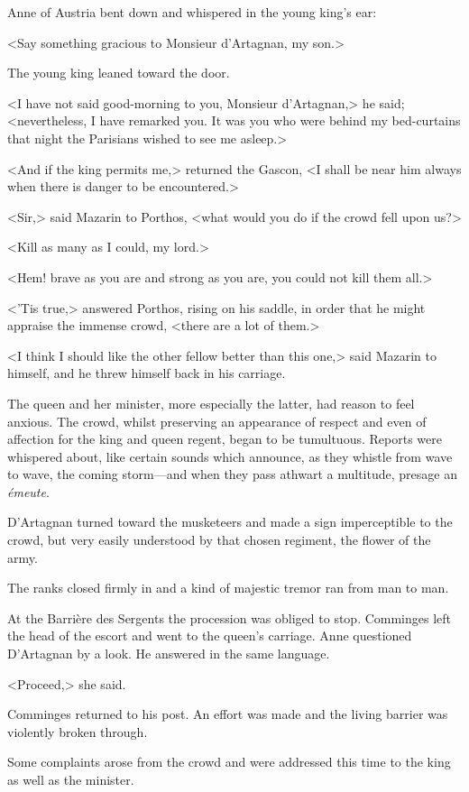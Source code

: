 Anne of Austria bent down and whispered in the young king's ear:

<Say something gracious to Monsieur d'Artagnan, my son.>

The young king leaned toward the door.

<I have not said good-morning to you, Monsieur d'Artagnan,> he said; <nevertheless, I have remarked you. It was you who were behind my bed-curtains that night the Parisians wished to see me asleep.>

<And if the king permits me,> returned the Gascon, <I shall be near him always when there is danger to be encountered.>

<Sir,> said Mazarin to Porthos, <what would you do if the crowd fell upon us?>

<Kill as many as I could, my lord.>

<Hem! brave as you are and strong as you are, you could not kill them all.>

<'Tis true,> answered Porthos, rising on his saddle, in order that he might appraise the immense crowd, <there are a lot of them.>

<I think I should like the other fellow better than this one,> said Mazarin to himself, and he threw himself back in his carriage.

The queen and her minister, more especially the latter, had reason to feel anxious. The crowd, whilst preserving an appearance of respect and even of affection for the king and queen regent, began to be tumultuous. Reports were whispered about, like certain sounds which announce, as they whistle from wave to wave, the coming storm—and when they pass athwart a multitude, presage an \textit{émeute}.

D'Artagnan turned toward the musketeers and made a sign imperceptible to the crowd, but very easily understood by that chosen regiment, the flower of the army.

The ranks closed firmly in and a kind of majestic tremor ran from man to man.

At the Barrière des Sergents the procession was obliged to stop. Comminges left the head of the escort and went to the queen's carriage. Anne questioned D'Artagnan by a look. He answered in the same language.

<Proceed,> she said.

Comminges returned to his post. An effort was made and the living barrier was violently broken through.

Some complaints arose from the crowd and were addressed this time to the king as well as the minister.

